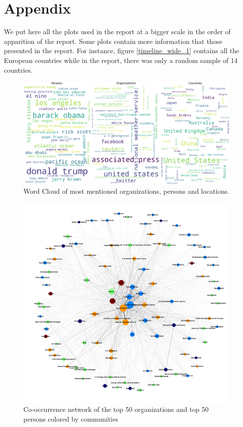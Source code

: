 \documentclass[a4paper]{article}
\begin{document}
\section*{Appendix}
We put here all the plots used in the report at a bigger scale in the order of apparition of the report. Some plots contain more information that those presented in the report. For instance, figure \ref{timeline_wide_1} contains all the European countries while in the report, there was only a random sample of 14 countries.

\hspace{5cm}

\begin{figure}[h]
   \centering
   \includegraphics[scale=0.4]{wordcloud_global.png}
   \caption{\label{actors_wide} Word Cloud of most mentioned organizations, persons and locations.}
\end{figure}

\begin{figure}[h]
   \centering
    \includegraphics[scale=0.2]{top_50.png}
    \centering
    \caption{\label{network_wide} Co-occurrence network of the top 50 organizations and top 50 persons colored by communities}
\end{figure}
\clearpage
\end{document}
